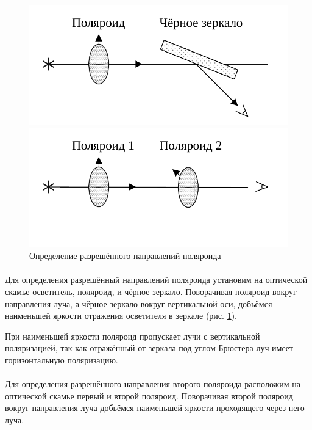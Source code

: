 \documentclass[a4paper,12pt]{article} %
\begin{document}
\begin{figure}[h]
\center
\begin{minipage}{0.49\textwidth}
\includegraphics[width=\textwidth]{exp1.pdf}
\end{minipage}
\begin{minipage}{0.49\textwidth}
\includegraphics[width=\textwidth]{exp1_1.pdf}
\end{minipage}
\caption{Определение разрешённого направлений поляроида}
\label{fig:exp1}
\end{figure}

\paragraph{} Для определения разрешённый направлений поляроида установим на оптической скамье осветитель, поляроид, и чёрное зеркало. Поворачивая поляроид вокруг направления луча, а чёрное зеркало вокруг вертикальной оси, добьёмся наименьшей яркости отражения осветителя в зеркале (рис. \ref{fig:exp1}). 

При наименьшей яркости поляроид пропускает лучи с вертикальной поляризацией, так как отражённый от зеркала под углом Брюстера луч имеет горизонтальную поляризацию.

\paragraph{} Для определения разрешённого направления второго поляроида расположим на оптической скамье первый и второй поляроид. Поворачивая второй поляроид вокруг направления луча добьёмся наименьшей яркости проходящего через него луча.
\end{document}
